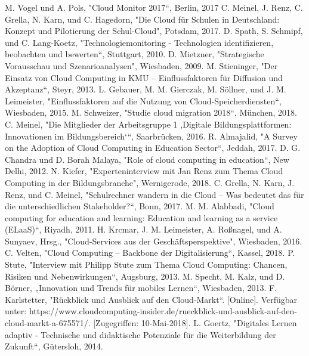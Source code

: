 \documentclass[conference]{IEEEtran}
\begin{document}
\begin{thebibliography}{00}
M. Vogel und A. Pols, "Cloud Monitor 2017“, Berlin, 2017
 C. Meinel, J. Renz, C. Grella, N. Karn, und C. Hagedorn, "Die Cloud für Schulen in Deutschland: Konzept und Pilotierung der Schul-Cloud", Potsdam, 2017.
D. Spath, S. Schmipf, und C. Lang-Koetz, "Technologiemonitoring - Technologien identifizieren, beobachten und bewerten“, Stuttgart, 2010.
 D. Mietzner, "Strategische Vorausschau und Szenarioanalysen", Wiesbaden, 2009.
 M. Stieninger, "Der Einsatz von Cloud Computing in KMU – Einflussfaktoren für Diffusion und Akzeptanz“, Steyr, 2013.
 L. Gebauer, M. M. Gierczak, M. Söllner, und J. M. Leimeister, "Einflussfaktoren auf die Nutzung von Cloud-Speicherdiensten“, Wiesbaden, 2015.
 M. Schweizer, "Studie cloud migration 2018“, München, 2018.
 C. Meinel, "Die Mitglieder der Arbeitsgruppe 1 ‚Digitale Bildungsplattformen: Innovationen im Bildungsbereich‘“, Saarbrücken, 2016.
 R. Almajalid, "A Survey on the Adoption of Cloud Computing in Education Sector“, Jeddah, 2017.
 D. G. Chandra und D. Borah Malaya, "Role of cloud computing in education“, New Delhi, 2012.
 N. Kiefer, "Experteninterview mit Jan Renz zum Thema Cloud Computing in der Bildungsbranche", Wernigerode, 2018.
 C. Grella, N. Karn, J. Renz, und C. Meinel, "Schulrechner wandern in die Cloud – Was bedeutet das für die unterschiedlichen Stakeholder?“, Bonn, 2017.
 M. M. Alabbadi, "Cloud computing for education and learning: Education and learning as a service (ELaaS)“, Riyadh, 2011.
 H. Krcmar, J. M. Leimeister, A. Roßnagel, und A. Sunyaev, Hrsg., "Cloud-Services aus der Geschäftsperspektive", Wiesbaden, 2016.
 C. Velten, "Cloud Computing – Backbone der Digitalisierung“, Kassel, 2018.
 P. Stute, "Interview mit Philipp Stute zum Thema Cloud Computing: Chancen, Risiken und Nebenwirkungen“, Augsburg, 2013.
 M. Specht, M. Kalz, und D. Börner, „Innovation und Trends für mobiles Lernen“, Wiesbaden, 2013.
 F. Karlstetter, "Rückblick und Ausblick auf den Cloud-Markt“. [Online]. Verfügbar unter: https://www.cloudcomputing-insider.de/rueckblick-und-ausblick-auf-den-cloud-markt-a-675571/. [Zugegriffen: 10-Mai-2018].
 L. Goertz, "Digitales Lernen adaptiv - Technische und didaktische Potenziale für die Weiterbildung der Zukunft“, Gütersloh, 2014.

\end{thebibliography}
\end{document}
